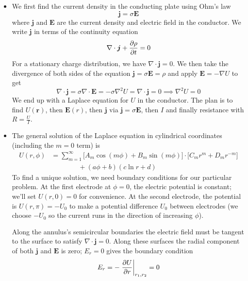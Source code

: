 \documentclass[11pt, a4paper]{article}
\renewcommand{\vec}[1]{\bm{#1}} %
\renewcommand{\r}{\vec{r}}
\newcommand{\E}{\vec{E}} %
\renewcommand{\div}{\nabla \cdot}
\renewcommand{\grad}{\nabla}
\renewcommand{\laplacian}{\nabla^{2}}
\begin{document}
\begin{itemize}
	\item We first find the current density in the conducting plate using Ohm's law
	\begin{equation*}
		\vec{j} = \sigma \E 
	\end{equation*}
	where $ \vec{j} $ and $ \E $ are the current density and electric field in the conductor. We write $ \vec{j} $ in terms of the continuity equation
	\begin{equation*}
		\div \vec{j} + \pdv{\rho}{t} = 0
	\end{equation*}
	For a stationary charge distribution, we have $ \div \vec{j} = 0 $. We then take the divergence of both sides of the equation $ \vec{j} = \sigma \E = \rho  $ and apply $ \E = - \grad U $ to get
	\begin{equation*}
		\div \vec{j} = \sigma \div \E = - \sigma \laplacian U = \div \vec{j} = 0 \implies \laplacian U = 0
	\end{equation*}
	We end up with a Laplace equation for $ U $ in the conductor. The plan is to find $ U(\r) $, then $ \E(r) $, then $ \vec{j} $ via $ \vec{j} = \sigma \E $, then $ I $ and finally resistance with $ R = \frac{U}{I} $. 
	
	\item The general solution of the Laplace equation in cylindrical coordinates (including the $ m = 0 $ term) is
	\begin{align*}
		U(r, \phi) &= \sum_{m=1}^{\infty} \big[A_{m}\cos(m\phi) + B_{m}\sin(m \phi)\big] \cdot \big[C_{m}r^{m} + D_{m}r^{-m}\big]\\
		& \qquad \qquad  + (a \phi + b)(c \ln r + d)
	\end{align*}
	To find a unique solution, we need boundary conditions for our particular problem. At the first electrode at $ \phi = 0 $, the electric potential is constant; we'll set $ U(r, 0) = 0 $  for convenience. At the second electrode, the potential is $ U(r, \pi)  = -U_{0}$ to make a potential difference $ U_{0} $ between electrodes (we choose $ -U_{0} $ so the current runs in the direction of increasing $ \phi $). 
	
	Along the annulus's semicircular boundaries the electric field must be tangent to the surface to satisfy $ \div \vec{j} = 0 $. Along these surfaces the radial component of both $ \vec{j} $ and $ \E $ is zero; $ E_{r} = 0 $ gives the boundary condition
	\begin{equation*}
		E_{r} = - \eval{\pdv{U}{r}}_{r_{1}, r_{2}} = 0
	\end{equation*}
	

\end{itemize}
\end{document}
